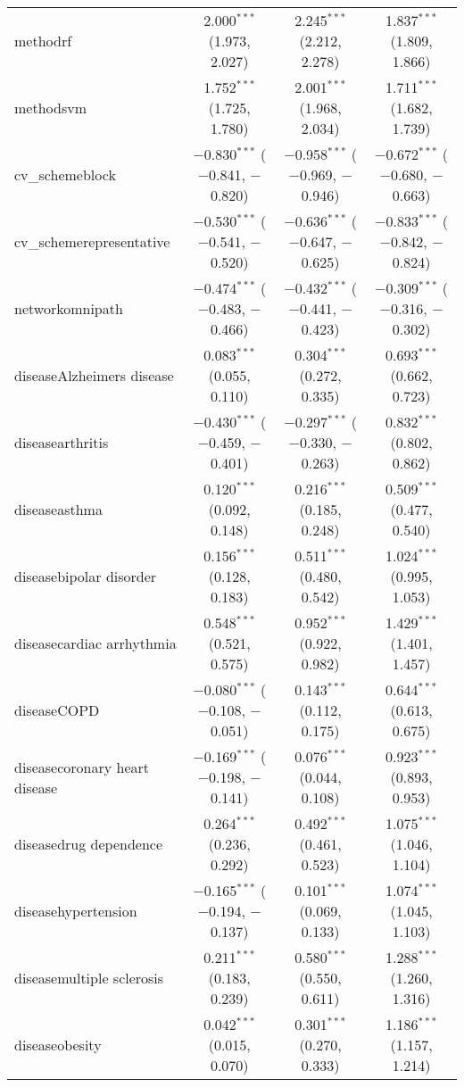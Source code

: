 \begin{table}[!htbp]
\begin{tabular}{@{\extracolsep{5pt}}lccc}
  methodrf & 2.000$^{***}$ (1.973, 2.027) & 2.245$^{***}$ (2.212, 2.278) & 1.837$^{***}$ (1.809, 1.866) \\ 
  methodsvm & 1.752$^{***}$ (1.725, 1.780) & 2.001$^{***}$ (1.968, 2.034) & 1.711$^{***}$ (1.682, 1.739) \\ 
  cv\_schemeblock & $-$0.830$^{***}$ ($-$0.841, $-$0.820) & $-$0.958$^{***}$ ($-$0.969, $-$0.946) & $-$0.672$^{***}$ ($-$0.680, $-$0.663) \\ 
  cv\_schemerepresentative & $-$0.530$^{***}$ ($-$0.541, $-$0.520) & $-$0.636$^{***}$ ($-$0.647, $-$0.625) & $-$0.833$^{***}$ ($-$0.842, $-$0.824) \\ 
  networkomnipath & $-$0.474$^{***}$ ($-$0.483, $-$0.466) & $-$0.432$^{***}$ ($-$0.441, $-$0.423) & $-$0.309$^{***}$ ($-$0.316, $-$0.302) \\ 
  diseaseAlzheimers disease & 0.083$^{***}$ (0.055, 0.110) & 0.304$^{***}$ (0.272, 0.335) & 0.693$^{***}$ (0.662, 0.723) \\ 
  diseasearthritis & $-$0.430$^{***}$ ($-$0.459, $-$0.401) & $-$0.297$^{***}$ ($-$0.330, $-$0.263) & 0.832$^{***}$ (0.802, 0.862) \\ 
  diseaseasthma & 0.120$^{***}$ (0.092, 0.148) & 0.216$^{***}$ (0.185, 0.248) & 0.509$^{***}$ (0.477, 0.540) \\ 
  diseasebipolar disorder & 0.156$^{***}$ (0.128, 0.183) & 0.511$^{***}$ (0.480, 0.542) & 1.024$^{***}$ (0.995, 1.053) \\ 
  diseasecardiac arrhythmia & 0.548$^{***}$ (0.521, 0.575) & 0.952$^{***}$ (0.922, 0.982) & 1.429$^{***}$ (1.401, 1.457) \\ 
  diseaseCOPD & $-$0.080$^{***}$ ($-$0.108, $-$0.051) & 0.143$^{***}$ (0.112, 0.175) & 0.644$^{***}$ (0.613, 0.675) \\ 
  diseasecoronary heart disease & $-$0.169$^{***}$ ($-$0.198, $-$0.141) & 0.076$^{***}$ (0.044, 0.108) & 0.923$^{***}$ (0.893, 0.953) \\ 
  diseasedrug dependence & 0.264$^{***}$ (0.236, 0.292) & 0.492$^{***}$ (0.461, 0.523) & 1.075$^{***}$ (1.046, 1.104) \\ 
  diseasehypertension & $-$0.165$^{***}$ ($-$0.194, $-$0.137) & 0.101$^{***}$ (0.069, 0.133) & 1.074$^{***}$ (1.045, 1.103) \\ 
  diseasemultiple sclerosis & 0.211$^{***}$ (0.183, 0.239) & 0.580$^{***}$ (0.550, 0.611) & 1.288$^{***}$ (1.260, 1.316) \\ 
  diseaseobesity & 0.042$^{***}$ (0.015, 0.070) & 0.301$^{***}$ (0.270, 0.333) & 1.186$^{***}$ (1.157, 1.214) \\ 

\end{tabular}
\end{table}
